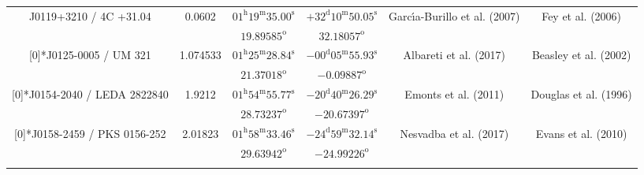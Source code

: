 \begin{landscape}
\begin{longtable}{cccccc}
  \multirow{2}[0]{*}{J0119+3210 / 4C +31.04} & \multirow{2}[0]{*}{ 0.0602 } &  
    $01^\text{h}19^\text{m}35.00^\text{s} $  & $ +32^\text{d}10^\text{m}50.05^\text{s} $  & 
    \multirow{2}[0]{*}{Garc{\'\i}a-Burillo et al. (2007) \cite{RedRef8_2007}} & \multirow{2}[0]{*}{Fey et al. (2006) \cite{CoordRef6_2006}} \\*
        & & $ 19.89585 ^\text{o}$ & $ 32.18057 ^\text{o}$ & & \\ \addlinespace 
  
  \multirow{2}[0]{*}{J0125-0005 / UM 321} & \multirow{2}[0]{*}{ 1.074533 } &  
    $ 01^\text{h}25^\text{m}28.84^\text{s}$  & $-00^\text{d}05^\text{m}55.93^\text{s}$  & 
    \multirow{2}[0]{*}{Albareti et al. (2017) \cite{RedRef9_2017}} & \multirow{2}[0]{*}{Beasley et al. (2002) \cite{CoordRef4_2002}} \\*
        & & $ 21.37018 ^\text{o}$ & $ -0.09887 ^\text{o}$ & & \\ \addlinespace 
  
  \multirow{2}[0]{*}{J0154-2040 / LEDA 2822840} & \multirow{2}[0]{*}{ 1.9212 } &  
    $ 01^\text{h}54^\text{m}55.77^\text{s}$  & $ -20^\text{d}40^\text{m}26.29^\text{s}$  & 
    \multirow{2}[0]{*}{Emonts et al. (2011) \cite{RedRef10_2011}} & \multirow{2}[0]{*}{Douglas et al. (1996) \cite{CoordRef10_1996}} \\*
        & & $ 28.73237 ^\text{o}$ & $ -20.67397 ^\text{o}$ & & \\ \addlinespace
  \multirow{2}[0]{*}{J0158-2459 / PKS 0156-252} & \multirow{2}[0]{*}{ 2.01823 } &  
    $ 01^\text{h}58^\text{m}33.46^\text{s}$  & $ -24^\text{d}59^\text{m}32.14^\text{s}$  & 
    \multirow{2}[0]{*}{Nesvadba et al. (2017) \cite{RedRef11_2017}} & \multirow{2}[0]{*}{Evans et al. (2010) \cite{CoordRef1_2010}} \\*
         & & $ 29.63942 ^\text{o}$ & $ -24.99226 ^\text{o}$ & & \\ \addlinespace 
         

\end{longtable}
\end{landscape}
